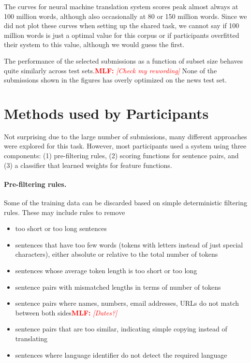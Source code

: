 \documentclass[11pt,a4paper]{article}
\newcommand{\todomlf}[1] {\textcolor{red}{\textbf{MLF:} \em [#1]}\marginpar{\textcolor{red}{\Large \textbf{!!!}}}}
\begin{document}
The curves for neural machine translation system scores peak almost always at 100 million words, although also occasionally at 80 or 150 million words. Since we did not plot these curves when setting up the shared task, we cannot say if 100 million words is just a optimal value for this corpus or if participants overfitted their system to this value, although we would guess the first.

The performance of the selected submissions as a function of subset size behaves quite similarly across test sets.\todomlf{Check my rewording}
None of the submissions shown in the figures has overly optimized on the news test set.

\section{Methods used by Participants}
Not surprising due to the large number of submissions, many different approaches were explored for this task. However, most participants used a system using three components: (1) pre-filtering rules, (2) scoring functions for sentence pairs, and (3) a classifier that learned weights for feature functions.

\paragraph{Pre-filtering rules.} Some of the training data can be discarded based on simple deterministic filtering rules. These may include rules to remove
\begin{itemize}\vspace{-2pt}\itemsep 1pt
\item too short or too long sentences
\item sentences that have too few words (tokens with letters instead of just special characters), either absolute or relative to the total number of tokens
\item sentences whose average token length is too short or too long 
\item sentence pairs with mismatched lengths in terms of number of tokens
\item sentence pairs where names, numbers, email addresses, URLs do not match between both sides\todomlf{Dates?}
\item sentence pairs that are too similar, indicating simple copying instead of translating
\item sentences where language identifier do not detect the required language
\end{itemize}
\end{document}
